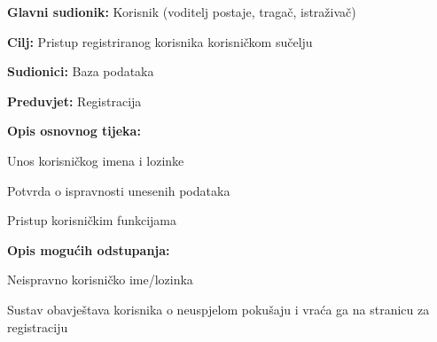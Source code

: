 					\noindent {}
					\begin{packed_item}
	
						\item \textbf{Glavni sudionik: }Korisnik (voditelj postaje, tragač, istraživač)
						\item  \textbf{Cilj:} Pristup registriranog korisnika korisničkom sučelju
						\item  \textbf{Sudionici:} Baza podataka
						\item  \textbf{Preduvjet:} Registracija
						\item  \textbf{Opis osnovnog tijeka:} 
						
						
						\item[] \begin{packed_enum}
	
							\item Unos korisničkog imena i lozinke							
							\item Potvrda o ispravnosti unesenih podataka
							\item Pristup korisničkim funkcijama
							
						\end{packed_enum}
						
						\item  \textbf{Opis mogućih odstupanja:}
						
						\item[] \begin{packed_item}
	
							\item[2.a] Neispravno korisničko ime/lozinka
							\item[] \begin{packed_enum}
								
								\item Sustav obavještava korisnika o neuspjelom pokušaju i vraća ga na stranicu za registraciju 
								
							\end{packed_enum}
							
						\end{packed_item}
					\end{packed_item}
					

